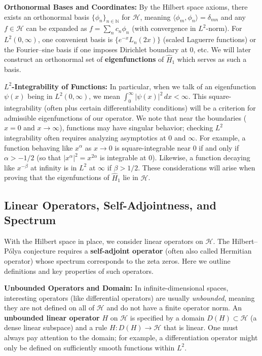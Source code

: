 \documentclass[12pt]{article}
\theoremstyle{plain}
\theoremstyle{definition}
\begin{document}
\textbf{Orthonormal Bases and Coordinates:} By the Hilbert space axioms, there exists an orthonormal basis \(\{\phi_n\}_{n\in \mathbb{N}}\) for \(\mathcal{H}\), meaning \(\langle \phi_m,\phi_n\rangle = \delta_{mn}\) and any \(f\in\mathcal{H}\) can be expanded as \(f = \sum_n c_n \phi_n\) (with convergence in \(L^2\)-norm). For \(L^2(0,\infty)\), one convenient basis is \(\{e^{-x}L_n(2x)\}\) (scaled Laguerre functions) or the Fourier--sine basis if one imposes Dirichlet boundary at 0, etc. We will later construct an orthonormal set of \textbf{eigenfunctions} of \(\hat{H}_1\) which serves as such a basis.

\textbf{\(L^2\)-Integrability of Functions:} In particular, when we talk of an eigenfunction \(\psi(x)\) being in \(L^2(0,\infty)\), we mean \(\int_0^\infty |\psi(x)|^2\,dx < \infty\). This square-integrability (often plus certain differentiability conditions) will be a criterion for admissible eigenfunctions of our operator. We note that near the boundaries (\(x=0\) and \(x\to\infty\)), functions may have singular behavior; checking \(L^2\) integrability often requires analyzing asymptotics at 0 and \(\infty\). For example, a function behaving like \(x^\alpha\) as \(x\to 0\) is square-integrable near 0 if and only if \(\alpha > -1/2\) (so that \(|x^\alpha|^2 = x^{2\alpha}\) is integrable at 0). Likewise, a function decaying like \(x^{-\beta}\) at infinity is in \(L^2\) at \(\infty\) if \(\beta > 1/2\). These considerations will arise when proving that the eigenfunctions of \(\hat{H}_1\) lie in \(\mathcal{H}\).

\subsection{Linear Operators, Self-Adjointness, and Spectrum}

With the Hilbert space in place, we consider linear operators on \(\mathcal{H}\). The Hilbert--P\'olya conjecture requires a \textbf{self-adjoint operator} (often also called Hermitian operator) whose spectrum corresponds to the zeta zeros. Here we outline definitions and key properties of such operators.

\textbf{Unbounded Operators and Domain:} In infinite-dimensional spaces, interesting operators (like differential operators) are usually \emph{unbounded}, meaning they are not defined on all of \(\mathcal{H}\) and do not have a finite operator norm. An \textbf{unbounded linear operator} \(H\) on \(\mathcal{H}\) is specified by a domain \(D(H)\subset \mathcal{H}\) (a dense linear subspace) and a rule \(H: D(H) \to \mathcal{H}\) that is linear. One must always pay attention to the domain; for example, a differentiation operator might only be defined on sufficiently smooth functions within \(L^2\).
\end{document}
